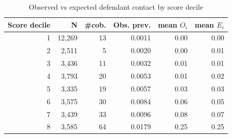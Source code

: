 \begin{table}[htbp]\centering
\caption{Observed vs expected defendant contact by score decile}
\label{tab:obs_exp_bins}
\begin{tabular}{rrrrrr}\hline
Score decile & N & \#cob. & Obs. prev. & mean $O_i$ & mean $E_i$ \\\hline
1 & 12,269 & 13 & 0.0011 & 0.00 & 0.00 \\
2 &  2,511 & 5 & 0.0020 & 0.00 & 0.01 \\
3 &  3,436 & 11 & 0.0032 & 0.01 & 0.01 \\
4 &  3,793 & 20 & 0.0053 & 0.01 & 0.02 \\
5 &  3,335 & 19 & 0.0057 & 0.03 & 0.03 \\
6 &  3,575 & 30 & 0.0084 & 0.06 & 0.05 \\
7 &  3,439 & 33 & 0.0096 & 0.08 & 0.07 \\
8 &  3,585 & 64 & 0.0179 & 0.25 & 0.25 \\
\hline\end{tabular}\end{table}
